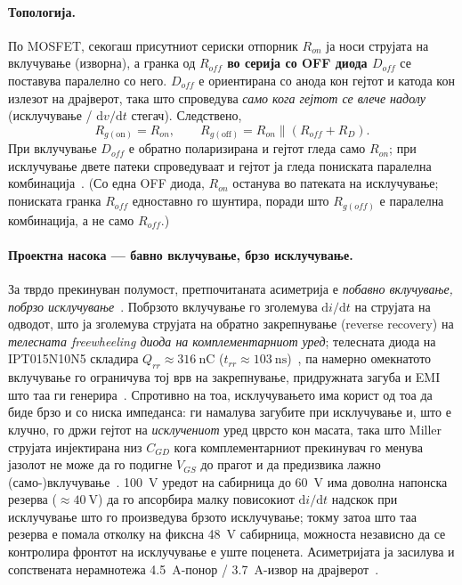 \documentclass[journal,onecolumn,11pt]{IEEEtran}
\begin{document}
\paragraph{Топологија.} По MOSFET, секогаш присутниот сериски отпорник
\textbf{$R_{on}$} ја носи струјата на вклучување (изворна), а гранка од
\textbf{$R_{off}$ во серија со OFF диода $D_{off}$} се поставува паралелно со него.
$D_{off}$ е ориентирана со анода кон гејтот и катода кон излезот на драјверот, така
што спроведува \emph{само кога гејтот се влече надолу} (исклучување /
$\mathrm{d}v/\mathrm{d}t$ стегач). Следствено,
\begin{equation}
R_{g(\text{on})}=R_{on},\qquad R_{g(\text{off})}=R_{on}\parallel(R_{off}+R_{D}).
\end{equation}
При вклучување $D_{off}$ е обратно поларизирана и гејтот гледа само $R_{on}$; при
исклучување двете патеки спроведуваат и гејтот ја гледа пониската паралелна
комбинација~\cite{balogh,pmeg4030er}. (Со една OFF диода, $R_{on}$ останува во
патеката на исклучување; пониската гранка $R_{off}$ едноставно го шунтира, поради што
$R_{g(off)}$ е паралелна комбинација, а не само $R_{off}$.)

\paragraph{Проектна насока --- бавно вклучување, брзо исклучување.} За тврдо
прекинуван полумост, претпочитаната асиметрија е \emph{побавно вклучување, побрзо
исклучување}~\cite{pmeg4030er,nexperia_gdfund,toshiba_dvdt}. Побрзото вклучување го
зголемува $\mathrm{d}i/\mathrm{d}t$ на струјата на одводот, што ја зголемува струјата
на обратно закрепнување (reverse recovery) на \emph{телесната freewheeling диода на
комплементарниот уред}; телесната диода на IPT015N10N5 складира
$Q_{rr}\approx\SI{316}{\nano\coulomb}$ ($t_{rr}\approx\SI{103}{\nano\second}$)~\cite{ipt015ds},
па намерно омекнатото вклучување го ограничува тој врв на закрепнување, придружната
загуба и EMI што таа ги генерира~\cite{pmeg4030er,nexperia_gdfund}. Спротивно на тоа,
исклучувањето има корист од тоа да биде брзо и со ниска импеданса: ги намалува
загубите при исклучување и, што е клучно, го држи гејтот на \emph{исклучениот} уред
цврсто кон масата, така што Miller струјата инјектирана низ $C_{GD}$ кога
комплементарниот прекинувач го менува јазолот не може да го подигне $V_{GS}$ до
прагот и да предизвика лажно (само-)вклучување~\cite{nexperia_gdfund,toshiba_dvdt}.
\SI{100}{\volt} уредот на сабирница до \SI{60}{\volt} има доволна напонска резерва
($\approx\SI{40}{\volt}$) да го апсорбира малку повисокиот $\mathrm{d}i/\mathrm{d}t$
надскок при исклучување што го произведува брзото исклучување; токму затоа што таа
резерва е помала отколку на фиксна \SI{48}{\volt} сабирница, можноста независно да се
контролира фронтот на исклучување е уште поценета. Асиметријата ја засилува и
сопствената нерамнотежа \SI{4.5}{\ampere}-понор / \SI{3.7}{\ampere}-извор на
драјверот~\cite{ucc27211}.
\end{document}
